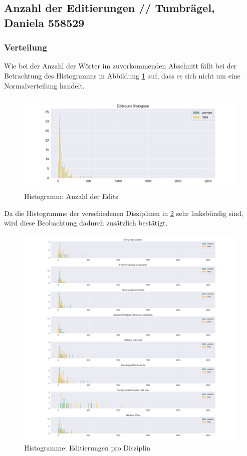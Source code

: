 \documentclass[11pt]{article}
\begin{document}
\subsection {Anzahl der Editierungen // Tumbrägel, Daniela 558529}
\subsubsection {Verteilung}
Wie bei der Anzahl der Wörter im zuvorkommenden Abschnitt fällt bei der Betrachtung des Histogramms in Abbildung \ref{fig:editcountHistogram} auf, dass es sich nicht um eine Normalverteilung handelt.

\begin{figure}
\includegraphics[width=1\textwidth]{figures/editcount_small_bins_histogram.png}
\caption[Histogramm: Anzahl der Edits]{Histogramm: Anzahl der Edits}
\label{fig:editcountHistogram}
\end{figure}

Da die Histogramme der verschiedenen Disziplinen in \ref{fig:editcountDisciplineHistogram} sehr linksbündig sind, wird diese Beobachtung dadurch zusätzlich bestätigt. 

\begin{figure}
\includegraphics[width=1\textwidth]{figures/editcount_disciplines_histogram.png}
\caption[Histogramme: Editierungen pro Disziplin]{Histogramme: Editierungen pro Disziplin}
\label{fig:editcountDisciplineHistogram}
\end{figure}
\end{document}
